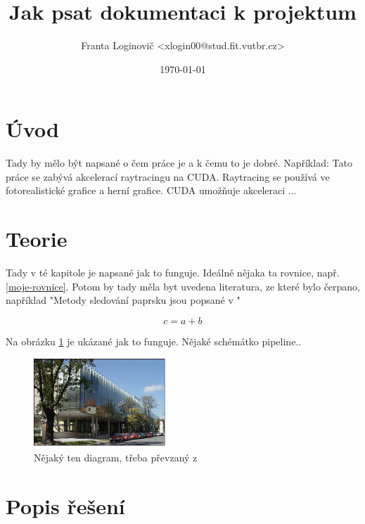 \documentclass[a4paper, 12pt]{article}
\title{Jak psat dokumentaci k projektum}
\author{Franta Loginovič <xlogin00@stud.fit.vutbr.cz>}
\date{\today}
\begin{document}
\maketitle

\section{Úvod}

Tady by mělo být napsané o čem práce je a k čemu to je dobré. Například: Tato práce se zabývá akcelerací
raytracingu na CUDA. Raytracing se používá ve fotorealistické grafice a herní grafice. CUDA umožňuje
akceleraci ...


\section{Teorie}

Tady v té kapitole je napsané jak to funguje. Ideálně nějaka ta rovnice, např. \ref{moje-rovnice}. Potom by
tady měla byt uvedena literatura, ze které bylo čerpano, například "Metody sledování paprsku jsou popsané v \cite{Cox2008} \cite{zemcik2006}"


\begin{equation}
  \label{moje-rovnice}
  c = a + b
\end{equation}

Na obrázku \ref{fig:obrazek} je ukázané jak to funguje. Nějaké schémátko pipeline..

\begin{figure}[htb]
  \centering
  \includegraphics[width=5cm,keepaspectratio]{obrazek.jpg}
  \caption{Nějaký ten diagram, třeba převzaný z \cite{wikipedia}}
  \label{fig:obrazek}
\end{figure}


\section{Popis řešení}
\end{document}
